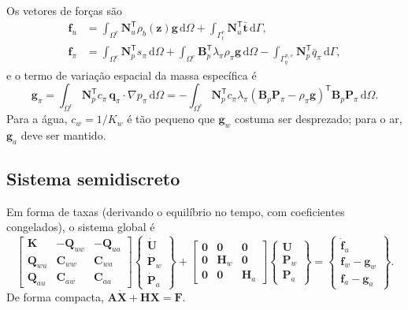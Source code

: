 \documentclass[11pt,a4paper]{article}
\newcommand{\dd}{\mathrm{d}}
\begin{document}
Os vetores de forças são
\begin{align*}
\mathbf f_u&=\int_{\Omega^e}\mathbf N_u^{\mathsf T}\rho_b(\mathbf z)\mathbf g\,\dd\Omega
+\int_{\Gamma_t^e}\mathbf N_u^{\mathsf T}\bar{\mathbf t}\,\dd\Gamma,\\
\mathbf f_\pi&=\int_{\Omega^e}\mathbf N_p^{\mathsf T}s_\pi\,\dd\Omega
+\int_{\Omega^e}\mathbf B_p^{\mathsf T}\lambda_\pi\rho_\pi\mathbf g\,\dd\Omega
-\int_{\Gamma_q^{\pi,e}}\mathbf N_p^{\mathsf T}\bar q_\pi\,\dd\Gamma,
\end{align*}
e o termo de variação espacial da massa específica é
\begin{equation*}
\mathbf g_\pi=\int_{\Omega^e}\mathbf N_p^{\mathsf T}c_\pi\,\mathbf q_\pi\cdot\nabla p_\pi\,\dd\Omega
=-\int_{\Omega^e}\mathbf N_p^{\mathsf T}c_\pi\lambda_\pi
(\mathbf B_p\mathbf P_\pi-\rho_\pi\mathbf g)^{\mathsf T}\mathbf B_p\mathbf P_\pi\,\dd\Omega .
\end{equation*}
Para a água, $c_w=1/K_w$ é tão pequeno que $\mathbf g_w$ costuma ser
desprezado; para o ar, $\mathbf g_a$ deve ser mantido.

\subsection{Sistema semidiscreto}

Em forma de taxas (derivando o equilíbrio no tempo, com coeficientes
congelados), o sistema global é
\begin{equation*}
\boxed{
\begin{bmatrix}\mathbf K&-\mathbf Q_{uw}&-\mathbf Q_{ua}\\
\mathbf Q_{wu}&\mathbf C_{ww}&\mathbf C_{wa}\\
\mathbf Q_{au}&\mathbf C_{aw}&\mathbf C_{aa}\end{bmatrix}
\begin{Bmatrix}\dot{\mathbf U}\\ \dot{\mathbf P}_w\\ \dot{\mathbf P}_a\end{Bmatrix}
+\begin{bmatrix}\mathbf 0&\mathbf 0&\mathbf 0\\ \mathbf 0&\mathbf H_w&\mathbf 0\\ \mathbf 0&\mathbf 0&\mathbf H_a\end{bmatrix}
\begin{Bmatrix}\mathbf U\\ \mathbf P_w\\ \mathbf P_a\end{Bmatrix}
=\begin{Bmatrix}\dot{\mathbf f}_u\\ \mathbf f_w-\mathbf g_w\\ \mathbf f_a-\mathbf g_a\end{Bmatrix}.}
\end{equation*}
De forma compacta, $\mathbf A\dot{\mathbf X}+\mathbf H\mathbf X=\mathbf F$.
\end{document}
